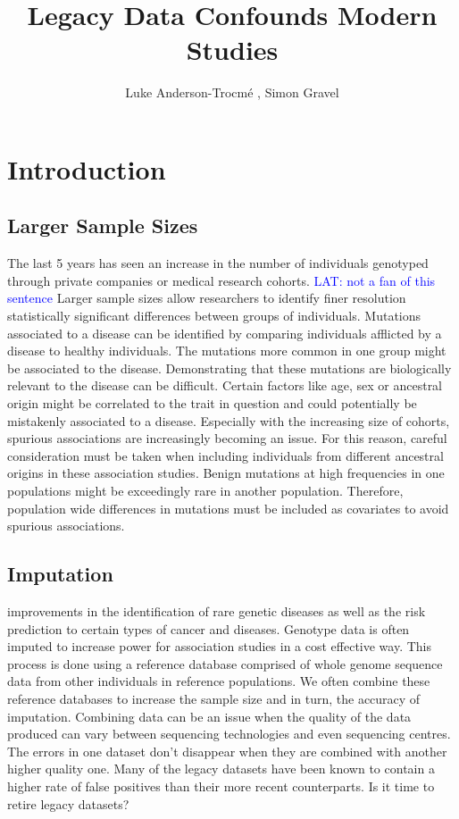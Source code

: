 \documentclass[12pt]{amsart}
\title{Legacy Data Confounds Modern Studies}
\author{Luke Anderson-Trocm\'e , Simon Gravel}
\newcommand{\lat}[1]{\textcolor{blue}{LAT: #1}}
\begin{document}
\maketitle
\tableofcontents
\clearpage
			\section{Introduction}
\subsection{Larger Sample Sizes}			
The last 5 years has seen an increase in the number of individuals genotyped through private companies or medical research cohorts. 
\lat{not a fan of this sentence}
Larger sample sizes allow researchers to identify finer resolution statistically significant differences between groups of individuals. 
Mutations associated to a disease can be identified by comparing individuals afflicted by a disease to healthy individuals. 
The mutations more common in one group might be associated to the disease.
Demonstrating that these mutations are biologically relevant to the disease can be difficult.
Certain factors like age, sex or ancestral origin might be correlated to the trait in question and could potentially be mistakenly associated to a disease. 
Especially with the increasing size of cohorts, spurious associations are increasingly becoming an issue. 
For this reason, careful consideration must be taken when including individuals from different ancestral origins in these association studies. 
Benign mutations at high frequencies in one populations might be exceedingly rare in another population. 
Therefore, population wide differences in mutations must be included as covariates to avoid spurious associations.

\subsection{Imputation}
 improvements in the identification of rare genetic diseases as well as the risk prediction to certain types of cancer and diseases. 
Genotype data is often imputed to increase power for association studies in a cost effective way. 
This process is done using a reference database comprised of whole genome sequence data from other individuals in reference populations. 
We often combine these reference databases to increase the sample size and in turn, the accuracy of imputation. 
Combining data can be an issue when the quality of the data produced can vary between sequencing technologies and even sequencing centres.  
The errors in one dataset don't disappear when they are combined with another higher quality one. 
Many of the legacy datasets have been known to contain a higher rate of false positives than their more recent counterparts. 
Is it time to retire legacy datasets? 
\end{document}
